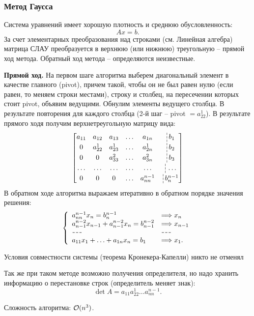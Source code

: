 \begin{multicols}{2}
    \subsubsection*{Метод Гаусса}
    Система уравнений имеет хорошую плотность и среднюю обусловленность:
    \[
        Ax = b.  
    \]
    За счет элементарных преобразования над строками (см. Линейная алгебра) матрица СЛАУ преобразуется в верхнюю (или нижнюю) треугольную -- прямой ход метода. Обратный ход метода -- определяются неизвестные. 
    \par 
    \textbf{Прямой ход.} На первом шаге алгоритма выберем диагональный элемент в качестве главного (pivot), причем такой, чтобы он не был равен нулю (если равен, то меняем строки местами), строку и столбец, на пересечении которых стоит pivot, объявим ведущими. Обнулим элементы ведущего столбца. В результате повторения для каждого столбца (2-й шаг -- pivot $= a^{1}_{22}$). В результате прямого ходя получим верхнетреугольную матрицу вида:
    \[
        \begin{bmatrix}
            a_{11} & a_{12} & a_{13} & \ldots & a_{1n} &  \dashline b_1\\
            0 & a_{22}^1 & a_{23}^1 & \ldots & a_{2n}^1 & \dashline b_2\\
            0 & 0 & a_{33}^2 & \ldots & a_{3n}^2 & \dashline b_3\\
            \ldots & \ldots & \ldots & \ldots & \ldots & \dashline \ldots \\
            0 & 0 & 0 & \ldots & a_{nn}^{n-1} & \dashline b_n^{n-1}
        \end{bmatrix}
    \]  
    В обратном ходе алгоритма выражаем итеративно в обратном порядке значения решения:
    \[
        \left\{\begin{array}{ll}
            a_{nn}^{n-1}x_n = b_n^{n-1} & \Longrightarrow x_n\\
            a_{n-1}^{n-2}x_{n-1} + a_{n-1}^{n-2}x_n = b_{n-1}^{n-2} & \Longrightarrow x_{n-1}\\
            \hdash & \hdash\\
            a_{11}x_1 + \ldots + a_{1n}x_n = b_1 & \Longrightarrow x_1.
        \end{array}\right.
    \]
    \begin{note}{}{}
        Условия совместности системы (теорема Кронекера-Капелли) никто не отменял
    \end{note}
    \begin{note}{}{}
        Так же при таком методе возможно получения определителя, но надо хранить информацию о перестановке строк (определитель меняет знак):
        \[
            \det A = a_{11}a^1_{22}\ldots a_{nn}^{n-1}.  
        \]
    \end{note}
    Сложность алгоритма: ${\cal O}(n^3)$.

\end{multicols}
